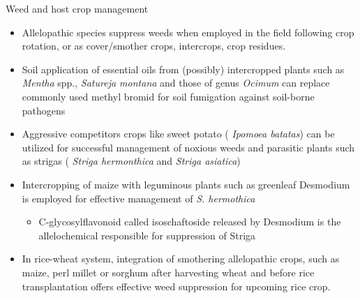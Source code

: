 \documentclass[11pt,dvipsnames,ignorenonframetext,aspectratio=169]{beamer}
\providecommand{\tightlist}{%
  \setlength{\itemsep}{0pt}\setlength{\parskip}{0pt}}
\begin{document}
\begin{frame}{Weed and host crop management}
\protect\hypertarget{weed-and-host-crop-management}{}
\small

\begin{itemize}
\tightlist
\item
  Allelopathic species suppress weeds when employed in the field
  following crop rotation, or as cover/smother crops, intercrops, crop
  residues.
\item
  Soil application of essential oils from (possibly) intercropped plants
  such as \emph{Mentha} spp., \emph{Satureja montana} and those of genus
  \emph{Ocimum} can replace commonly used methyl bromid for soil
  fumigation against soil-borne pathogens
\item
  Aggressive competitors crops like sweet potato ( \emph{Ipomoea
  batatas}) can be utilized for successful management of noxious weeds
  and parasitic plants such as strigas ( \emph{Striga hermonthica} and
  \emph{Striga asiatica})
\item
  Intercropping of maize with leguminous plants such as greenleaf
  Desmodium is employed for effective management of \emph{S. hermothica}

  \begin{itemize}
  \tightlist
  \item
    C-glycosylflavonoid called isoschaftoside released by Desmodium is
    the allelochemical responsible for suppression of Striga
  \end{itemize}
\item
  In rice-wheat system, integration of smothering allelopathic crops,
  such as maize, perl millet or sorghum after harvesting wheat and
  before rice transplantation offers effective weed suppression for
  upcoming rice crop.
\end{itemize}
\end{frame}
\end{document}
